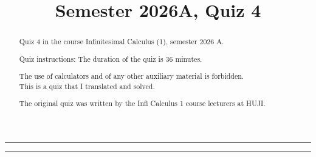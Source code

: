 \documentclass[english]{article}
\theoremstyle{definition}
\begin{document}
\title{{\Large\vspace{-6em}Semester 2026A, Quiz 4\vspace{-3em}}}

\maketitle
\rule[0.5ex]{1\columnwidth}{1pt}
\begin{abstract}
Quiz 4 in the course Infinitesimal Calculus (1), semester 2026 A.

Quiz instructions: The duration of the quiz is 36 minutes.

The use of calculators and of any other auxiliary material is forbidden.
\\

This is a quiz that I translated and solved.

The original quiz was written by the Infi Calculus 1 course lecturers
at HUJI.
\end{abstract}
\medskip{}

\rule[0.5ex]{1\columnwidth}{1pt}

\medskip{}
\end{document}
